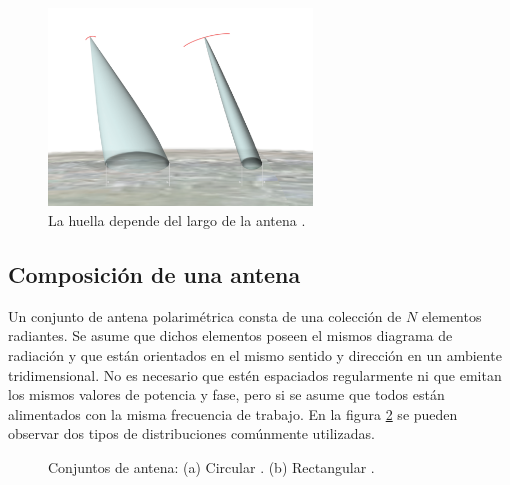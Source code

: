 \begin{figure}[H]
 \centering
 \includegraphics[width=7cm]{gfx/footprint.png}
 \caption{La huella depende del largo de la antena \cite{FootprintAntenna}.}
 \label{fig:footprint}
\end{figure}

\subsection{Composición de una antena}

Un conjunto de antena polarimétrica consta de una colección de $N$ elementos radiantes. Se asume que dichos elementos poseen el
mismos diagrama de radiación y que están orientados en el mismo sentido y dirección en un ambiente tridimensional. No es
necesario que estén espaciados regularmente ni que emitan los mismos valores de potencia y fase, pero si se asume
que todos están alimentados con la misma frecuencia de trabajo. En la figura \ref{fig:phasedArrayAntenna} se pueden observar
dos tipos de distribuciones comúnmente utilizadas.

\begin{figure}[H]
	\centering
		\caption{Conjuntos de antena: (a) Circular \cite{AntennaFront}. (b) Rectangular \cite{Aumann1989}.}
	\label{fig:phasedArrayAntenna}
\end{figure}

